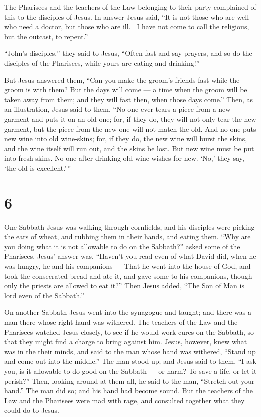 The Pharisees and the teachers of the Law belonging to
their party complained of this to the disciples of Jesus. 
In answer Jesus said, ``It is not those who are well who need a doctor,
but those who are ill.~ I have not come to call the
religious, but the outcast, to repent.''

 ``John's disciples,'' they said to Jesus, ``Often fast and
say prayers, and so do the disciples of the Pharisees, while yours are
eating and drinking!''

 But Jesus answered them, ``Can you make the groom's
friends fast while the groom is with them?  But the days
will come --- a time when the groom will be taken away from them; and
they will fast then, when those days come.''  Then, as an
illustration, Jesus said to them, ``No one ever tears a piece from a new
garment and puts it on an old one; for, if they do, they will not only
tear the new garment, but the piece from the new one will not match the
old.  And no one puts new wine into old wine-skins; for, if
they do, the new wine will burst the skins, and the wine itself will run
out, and the skins be lost.  But new wine must be put into
fresh skins.  No one after drinking old wine wishes for
new. `No,' they say, `the old is excellent.'\,''

\hypertarget{section-4}{%
\section{6}\label{section-4}}

 One Sabbath Jesus was walking through cornfields, and his
disciples were picking the ears of wheat, and rubbing them in their
hands, and eating them.  ``Why are you doing what it is not
allowable to do on the Sabbath?'' asked some of the Pharisees.
 Jesus' answer was, ``Haven't you read even of what David
did, when he was hungry, he and his companions ---  That he
went into the house of God, and took the consecrated bread and ate it,
and gave some to his companions, though only the priests are allowed to
eat it?''  Then Jesus added, ``The Son of Man is lord even
of the Sabbath.''

 On another Sabbath Jesus went into the synagogue and
taught; and there was a man there whose right hand was withered.
 The teachers of the Law and the Pharisees watched Jesus
closely, to see if he would work cures on the Sabbath, so that they
might find a charge to bring against him.  Jesus, however,
knew what was in the their minds, and said to the man whose hand was
withered, ``Stand up and come out into the middle.'' The man stood up;
 and Jesus said to them, ``I ask you, is it allowable to do
good on the Sabbath --- or harm? To save a life, or let it perish?''
 Then, looking around at them all, he said to the man,
``Stretch out your hand.'' The man did so; and his hand had become
sound.  But the teachers of the Law and the Pharisees were
mad with rage, and consulted together what they could do to Jesus.

